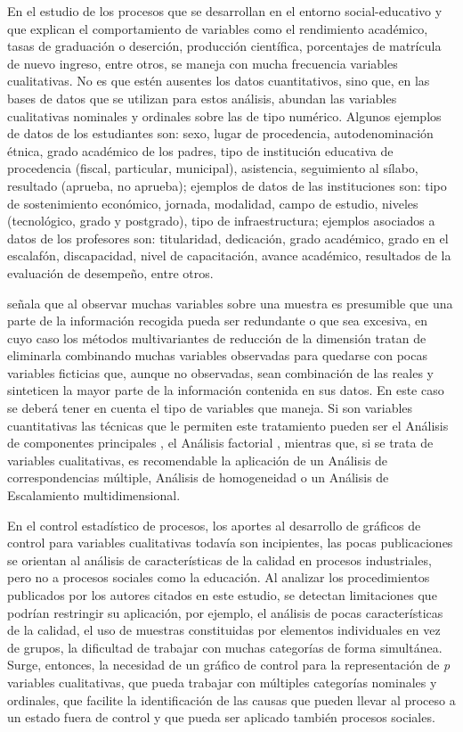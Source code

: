 \documentclass[mathematics,article,submit,moreauthors,pdftex]{mdpi}
\begin{document}
En el estudio de los procesos que se desarrollan en el entorno
social-educativo y que explican el comportamiento de variables como el
rendimiento académico, tasas de graduación o deserción, producción
científica, porcentajes de matrícula de nuevo ingreso, entre otros, se
maneja con mucha frecuencia variables cualitativas. No es que estén
ausentes los datos cuantitativos, sino que, en las bases de datos que se
utilizan para estos análisis, abundan las variables cualitativas
nominales y ordinales sobre las de tipo numérico. Algunos ejemplos de
datos de los estudiantes son: sexo, lugar de procedencia,
autodenominación étnica, grado académico de los padres, tipo de
institución educativa de procedencia (fiscal, particular, municipal),
asistencia, seguimiento al sílabo, resultado (aprueba, no aprueba);
ejemplos de datos de las instituciones son: tipo de sostenimiento
económico, jornada, modalidad, campo de estudio, niveles (tecnológico,
grado y postgrado), tipo de infraestructura; ejemplos asociados a datos
de los profesores son: titularidad, dedicación, grado académico, grado
en el escalafón, discapacidad, nivel de capacitación, avance académico,
resultados de la evaluación de desempeño, entre otros.

\citet{perez2004} señala que al observar muchas variables sobre una
muestra es presumible que una parte de la información recogida pueda ser
redundante o que sea excesiva, en cuyo caso los métodos multivariantes
de reducción de la dimensión tratan de eliminarla combinando muchas
variables observadas para quedarse con pocas variables ficticias que,
aunque no observadas, sean combinación de las reales y sinteticen la
mayor parte de la información contenida en sus datos. En este caso se
deberá tener en cuenta el tipo de variables que maneja. Si son variables
cuantitativas las técnicas que le permiten este tratamiento pueden ser
el Análisis de componentes principales
\citep{Person1901, Hotelling1933}, el Análisis factorial
\citep{ch1904, thurstone1947, kaiser1958}, mientras que, si se trata de
variables cualitativas, es recomendable la aplicación de un Análisis de
correspondencias múltiple, Análisis de homogeneidad o un Análisis de
Escalamiento multidimensional.

En el control estadístico de procesos, los aportes al desarrollo de
gráficos de control para variables cualitativas todavía son incipientes,
las pocas publicaciones se orientan al análisis de características de la
calidad en procesos industriales, pero no a procesos sociales como la
educación. Al analizar los procedimientos publicados por los autores
citados en este estudio, se detectan limitaciones que podrían restringir
su aplicación, por ejemplo, el análisis de pocas características de la
calidad, el uso de muestras constituidas por elementos individuales en
vez de grupos, la dificultad de trabajar con muchas categorías de forma
simultánea. Surge, entonces, la necesidad de un gráfico de control para
la representación de \emph{p} variables cualitativas, que pueda trabajar
con múltiples categorías nominales y ordinales, que facilite la
identificación de las causas que pueden llevar al proceso a un estado
fuera de control y que pueda ser aplicado también procesos sociales.
\end{document}

